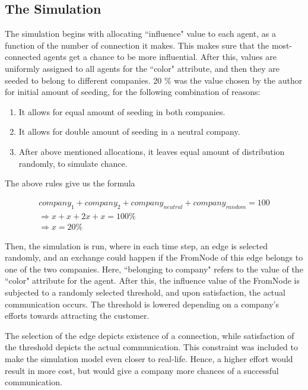 \subsection{The Simulation} 
 
The simulation begins with allocating ``influence" value to each agent, as a function of the number of connection it makes. This makes sure that the most-connected agents get a chance to be more influential. 
After this, values are uniformly assigned to all agents for the ``color" attribute, and then they are seeded to belong to different companies. 20 \% was the value chosen by the author for initial amount of seeding, for the following combination of reasons:

\begin{enumerate}
\item It allows for equal amount of seeding in both companies.
\item It allows for double amount of seeding in a neutral company.
\item After above mentioned allocations, it leaves equal amount of distribution randomly, to simulate chance.
\end{enumerate}

The above rules give us the formula

\begin{eqnarray}
company_1 + company_2 + company_{neutral} + company_{random} = 100 \nonumber \\
\Rightarrow x + x + 2x + x = 100 \% \nonumber \\
\Rightarrow x = 20 \% 
\label{eqn:seed fraction}
\end{eqnarray}

Then, the simulation is run, where in each time step, an edge is selected randomly, and an exchange could happen if the FromNode of this edge belongs to one of the two companies. Here, ``belonging to company" refers to the value of the ``color" attribute for the agent.
After this, the influence value of the FromNode is subjected to a randomly selected threshold, and upon satisfaction, the actual communication occurs. The threshold is lowered depending on a company's efforts towards attracting the customer. 

The selection of the edge depicts existence of a connection, while satisfaction of the threshold depicts the actual communication. This constraint was included to make the simulation model even closer to real-life. 
Hence, a higher effort would result in more cost, but would give a company more chances of a successful communication.

